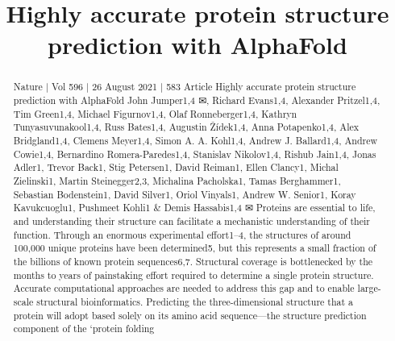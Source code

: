 \title{Highly accurate protein structure prediction with AlphaFold}

\maketitle

\begin{abstract}
Nature | Vol 596 | 26 August 2021 | 583 Article Highly accurate protein structure prediction with AlphaFold John Jumper1,4 ✉, Richard Evans1,4, Alexander Pritzel1,4, Tim Green1,4, Michael Figurnov1,4, Olaf Ronneberger1,4, Kathryn Tunyasuvunakool1,4, Russ Bates1,4, Augustin Žídek1,4, Anna Potapenko1,4, Alex Bridgland1,4, Clemens Meyer1,4, Simon A. A. Kohl1,4, Andrew J. Ballard1,4, Andrew Cowie1,4, Bernardino Romera-Paredes1,4, Stanislav Nikolov1,4, Rishub Jain1,4, Jonas Adler1, Trevor Back1, Stig Petersen1, David Reiman1, Ellen Clancy1, Michal Zielinski1, Martin Steinegger2,3, Michalina Pacholska1, Tamas Berghammer1, Sebastian Bodenstein1, David Silver1, Oriol Vinyals1, Andrew W. Senior1, Koray Kavukcuoglu1, Pushmeet Kohli1 \& Demis Hassabis1,4 ✉ Proteins are essential to life, and understanding their structure can facilitate a mechanistic understanding of their function. Through an enormous experimental effort1–4, the structures of around 100,000 unique proteins have been determined5, but this represents a small fraction of the billions of known protein sequences6,7. Structural coverage is bottlenecked by the months to years of painstaking effort required to determine a single protein structure. Accurate computational approaches are needed to address this gap and to enable large-scale structural bioinformatics. Predicting the three-dimensional structure that a protein will adopt based solely on its amino acid sequence—the structure prediction component of the ‘protein folding 
\end{abstract}

